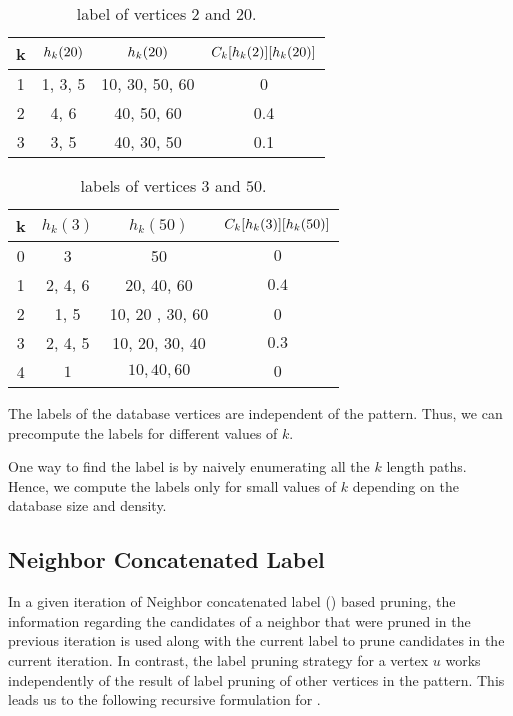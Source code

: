 \begin{table}[h]
    \centering
    \begin{tabular}{|c|c|c|c|}
        \hline
        k & $h_{k}(20)$ & $h_{k}(20)$ & $C_{k}[h_{k}(2)][h_{k}(20)]$\\
        \hline
        1 & 1, 3, 5 & 10, 30, 50, 60 & 0 \\
        2 & 4, 6 & 40, 50, 60 & 0.4 \\
        3 & 3, 5 & 40, 30, 50 & 0.1\\
        \hline
    \end{tabular}
    \caption{\khop label of vertices $2$ and $20$.}
    \label{tab:khop220}
\end{table}

\begin{table}[h]
    \centering
    \begin{tabular}{|c|c|c|c|}
        \hline
        k & $h_k(3)$ & $h_k(50)$ & $C_{k}[h_{k}(3)][h_{k}(50)]$ \\
        \hline
        0 & 3 & 50 & $0$\\
        1 & 2, 4, 6 & 20, 40, 60 & $0.4$ \\
        2 & 1, 5 & 10, 20 , 30, 60 & 0\\
        3 & 2, 4, 5 & 10, 20, 30, 40 & $0.3$ \\
        4 & $1$ & $10, 40, 60$ & $0$ \\
        \hline
    \end{tabular}
    \caption{\khop labels of vertices $3$ and $50$.}
    \label{tab:khop350}
\end{table}


\smallskip{} The \khop
labels of the database vertices are independent of the pattern. Thus, we
can precompute the \khop labels for different values of $k$.


One way to find the \khop label is by naively
enumerating all the $k$ length paths.
Hence, we compute the \khop labels only for small values of $k$ depending on the
database size and density. 





\subsection{Neighbor Concatenated Label} 
In a given iteration of Neighbor concatenated label (\ncl) based pruning,
the information regarding the candidates of a neighbor that were pruned 
in the previous iteration is used along with the current \khop label to
prune candidates in the current iteration. In contrast, the \khop label
pruning strategy for a vertex $u$ works independently of the result of
\khop label pruning of other vertices in the pattern. This leads us
to the following recursive formulation for \ncl.

